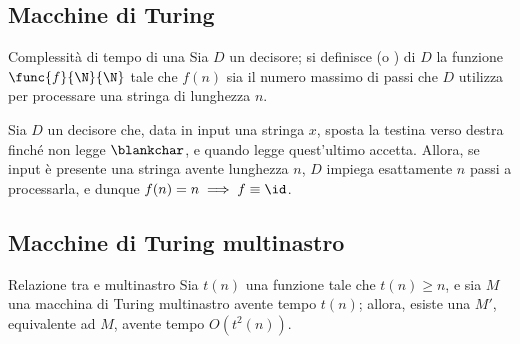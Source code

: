 \documentclass[a4paper, 12pt]{report}
\begin{document}
    \subsection{Macchine di Turing}

    \begin{frameddefn}{Complessità di tempo di una \TM}
        Sia $D$ un decisore; si definisce  (o ) di $D$ la funzione $\func{f}{\N}{\N}$ tale che $f(n)$ sia il numero massimo di passi che $D$ utilizza per processare una stringa di lunghezza $n$.
    \end{frameddefn}

    \begin{example}
        Sia $D$ un decisore che, data in input una stringa $x$, sposta la testina verso destra finché non legge $\blankchar$, e quando legge quest'ultimo accetta. Allora, se input è presente una stringa avente lunghezza $n$, $D$ impiega esattamente $n$ passi a processarla, e dunque $f(n) = n \implies f \equiv \id$.
    \end{example}

    \subsection{Macchine di Turing multinastro}

    \begin{framedthm}{Relazione tra \TM e \TM multinastro}
        Sia $t(n)$ una funzione tale che $t(n) \ge n$, e sia $M$ una macchina di Turing multinastro avente tempo $t(n)$; allora, esiste una \TM $M'$, equivalente ad $M$, avente tempo $O(t^2(n))$.
    \end{framedthm}
\end{document}
